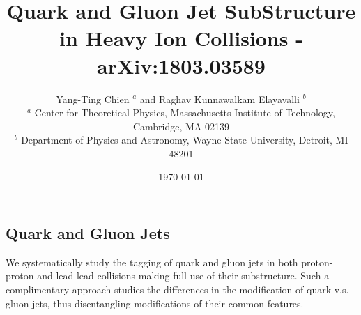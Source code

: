 \documentclass[final]{beamer}
\title
[Quark Matter 2018] %
{ %
Quark and Gluon Jet SubStructure  \\ in Heavy Ion Collisions - arXiv:1803.03589 
}
\author{Yang-Ting Chien $^{a}$ and Raghav Kunnawalkam Elayavalli $^{b}$\\
{\normalsize $^{a}$ Center for Theoretical Physics, Massachusetts Institute of Technology, Cambridge, MA 02139}\\
{\normalsize $^{b}$ Department of Physics and Astronomy, Wayne State University, Detroit, MI 48201}
}
\date{\today}
\begin{document}
\begin{frame}[t]


\begin{multicols}{3}


\section{Quark and Gluon Jets}

	We systematically study the tagging of quark and gluon jets in both proton-proton and lead-lead collisions making full use of their substructure. Such a complimentary approach studies the differences in the modification of quark v.s. gluon jets, thus disentangling modifications of their common features. 


\end{multicols}
\end{frame}
\end{document}
